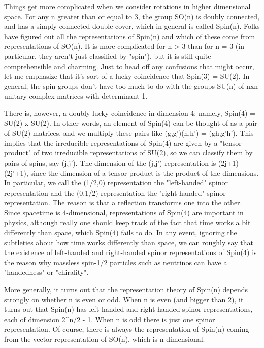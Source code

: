 Things get more complicated when we consider rotations in higher
dimensional space.  For any n greater than or equal to 3, the
group SO(n) is doubly connected, and has a simply connected double
cover, which in general is called Spin(n).  Folks have figured
out all the representations of Spin(n) and which of these come
from representations of SO(n).  It is more complicated for n > 3
than for n = 3 (in particular, they aren't just classified by
"spin"), but it is still quite comprehensible and charming.
Just to head off any confusions that might occur, let me emphasize
that it's sort of a lucky coincidence that Spin(3) = SU(2).  
In general, the spin groups don't have too much to do with the
groups SU(n) of nxn unitary complex matrices with determinant 1.

There is, however, a doubly lucky coincidence in dimension 4; 
namely, Spin(4) = SU(2) x SU(2).  In other words, an element of
Spin(4) can be thought of as a pair of SU(2) matrices, and
we multiply these pairs like (g,g')(h,h') = (gh,g'h').  This implies
that the irreducible representations of Spin(4) are given by a 
"tensor product" of two irreducible representations of SU(2), so we can 
classify them by pairs of spins, say (j,j').  The dimension of
the (j,j') representation is (2j+1)(2j'+1), since the dimension
of a tensor product is the product of the dimensions.  In particular, we
call the (1/2,0) representation the "left-handed" spinor representation
and the (0,1/2) representation the "right-handed" spinor representation.
The reason is that a reflection transforms one into the other.  
Since spacetime is 4-dimensional, representations of Spin(4) are
important in physics, although really one should keep track of
the fact that time works a bit differently than space, which Spin(4)
fails to do.  In any event, ignoring the subtleties about how
time works differently than space, we can roughly say that the 
existence of left-handed and right-handed spinor representations
of Spin(4) is the reason why massless spin-1/2 particles such as
neutrinos can have a "handedness" or "chirality".

More generally, it turns out that the representation theory
of Spin(n) depends strongly on whether n is even or odd.  When n
is even (and bigger than 2), it turns out that Spin(n) has
left-handed and right-handed spinor representations, each of
dimension 2^{n/2 - 1}.   When n is odd there is just one spinor
representation.  Of course, there is always the representation of
Spin(n) coming from the vector representation of SO(n), which is
n-dimensional.

